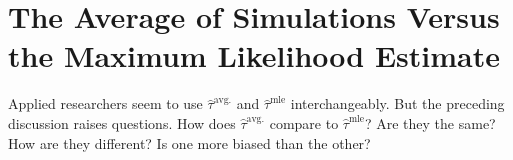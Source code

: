 \documentclass[10pt]{article}
\begin{document}

\section*{The Average of Simulations Versus the Maximum Likelihood Estimate}

Applied researchers seem to use $\hat{\tau}^\text{avg.}$ and $\hat{\tau}^\text{mle}$ interchangeably. 
But the preceding discussion raises questions. How does $\hat{\tau}^{\text{avg.}}$ compare to $\hat{\tau}^{\text{mle}}$? Are they the same? How are they different? Is one more biased than the other? 
\end{document}
